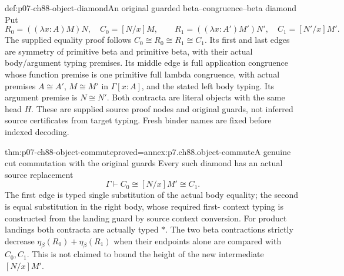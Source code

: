 \begin{hbdefinition}{def:p07-ch88-object-diamond}{An original guarded beta--congruence--beta diamond}
Put
\[
 R_0=((\lambda x:A)M)N,\quad C_0=[N/x]M,
 \qquad R_1=((\lambda x:A')M')N',\quad C_1=[N'/x]M'.
\]
The supplied equality proof follows \(C_0\cong R_0\cong R_1\cong C_1\).
Its first and last edges are symmetry of primitive beta and primitive
beta, with their actual body/argument typing premises. Its middle edge
is full application congruence whose function premise is one primitive
full lambda congruence, with actual premises
\(A\cong A'\), \(M\cong M'\) in \(\Gamma[x:A]\), and the
stated left body typing. Its argument premise is \(N\cong N'\).
Both contracta are literal objects with the same head \(H\).
These are supplied source proof nodes and original guards, not inferred
source certificates from target typing. Fresh binder names are fixed
before indexed decoding.
\end{hbdefinition}

\begin{hbtheorem}{thm:p07-ch88-object-commute}{proved=annex:p7.ch88.object-commute}{A genuine cut commutation with the original guards}
Every such diamond has an actual source replacement
\[
 \Gamma\vdash C_0\cong[N/x]M'\cong C_1.
\]
The first edge is typed single substitution of the actual body equality;
the second is equal substitution in the right body, whose required first-
context typing is constructed from the landing guard by source context
conversion. For product landings both contracta are actually typed
\(\ast\). The two beta contractions strictly decrease
\(\eta_\beta(R_0)+\eta_\beta(R_1)\) when their endpoints alone
are compared with \(C_0,C_1\). This is not claimed to bound the height
of the new intermediate \([N/x]M'\).
\end{hbtheorem}

